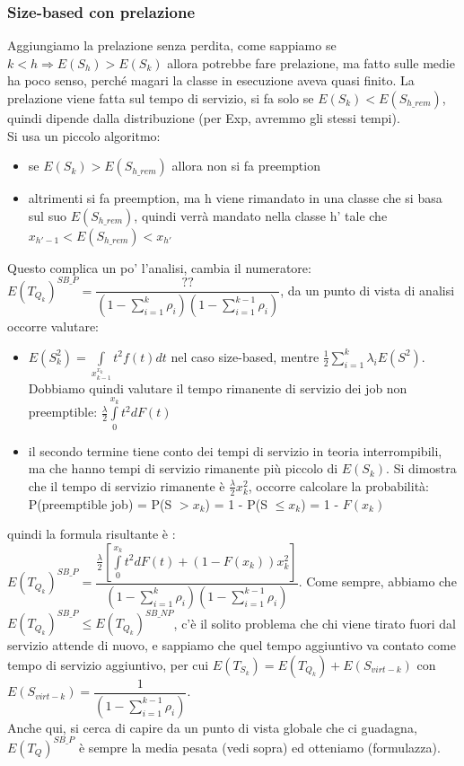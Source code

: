 \documentclass{article}
\begin{document}
\subsubsection{Size-based con prelazione}
Aggiungiamo la prelazione senza perdita, come sappiamo se $k < h \Rightarrow E(S_h) > E(S_k)$ allora potrebbe fare prelazione, ma fatto sulle medie ha poco senso, perché magari la classe in esecuzione aveva quasi finito. La prelazione viene fatta sul tempo di servizio, si fa solo se $E(S_k) < E(S_{h\_rem})$, quindi dipende dalla distribuzione (per Exp, avremmo gli stessi tempi).\\ Si usa un piccolo algoritmo:
\begin{itemize}
\item se $E(S_k) > E(S_{h\_rem})$ allora non si fa preemption
\item altrimenti si fa preemption, ma h viene rimandato in una classe che si basa sul suo $E(S_{h\_rem})$, quindi verrà mandato nella classe h' tale che $x_{h'-1} < E(S_{h\_rem}) < x_{h'}$
\end{itemize}
Questo complica un po' l'analisi, cambia il numeratore: $E(T_{Q_k})^{SB\_P} = \dfrac{??}{(1 - \sum\limits_{i=1}^{k} \rho_i)(1 - \sum\limits_{i=1}^{k-1} \rho_i)}$, da un punto di vista di analisi occorre valutare:
\begin{itemize}
\item $E(S_k^2) = \int\limits_{x_{k-1}^{x_k}} t^2 f(t) dt$ nel caso size-based, mentre $\frac{1}{2}\sum\limits_{i=1}^{k} \lambda_i E(S^2)$. \\ Dobbiamo quindi valutare il tempo rimanente di servizio dei job non preemptible: $\frac{\lambda}{2}\int\limits_{0}^{x_k} t^2 dF(t)$
\item il secondo termine tiene conto dei tempi di servizio in teoria interrompibili, ma che hanno tempi di servizio rimanente più piccolo di $E(S_k)$. Si dimostra che il tempo di servizio rimanente è $\frac{\lambda}{2}x_k^2$, occorre calcolare la probabilità: P(preemptible job) = P(S $> x_k$) = 1 - P(S $\leq x_k$) = 1 - $F(x_k)$
\end{itemize}
quindi la formula risultante è : $E(T_{Q_k})^{SB\_P} = \dfrac{\frac{\lambda}{2} [\int\limits_{0}^{x_k} t^2 dF(t) + (1-F(x_k))x_k^2]}{(1 - \sum\limits_{i=1}^{k} \rho_i)(1 - \sum\limits_{i=1}^{k-1} \rho_i)}$. Come sempre, abbiamo che $E(T_{Q_k})^{SB\_P} \leq E(T_{Q_k})^{SB\_NP}$, c'è il solito problema che chi viene tirato fuori dal servizio attende di nuovo, e sappiamo che quel tempo aggiuntivo va contato come tempo di servizio aggiuntivo, per cui $E(T_{S_k}) = E(T_{Q_k}) + E(S_{virt-k})$ con $E(S_{virt-k}) = \dfrac{1}{(1 - \sum\limits_{i=1}^{k-1} \rho_i)}$.\\ Anche qui, si cerca di capire da un punto di vista globale che ci guadagna, $E(T_Q)^{SB\_P}$ è sempre la media pesata (vedi sopra) ed otteniamo (formulazza).
\end{document}
